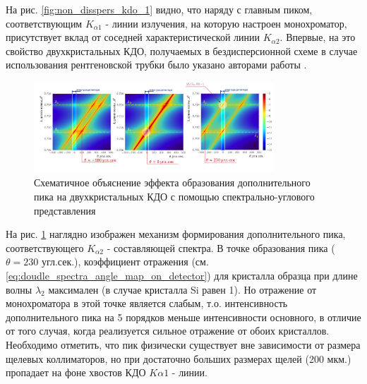 На рис. \ref{fig:non_disspers_kdo_1} видно, что наряду с главным пиком, соответствующим $K_{\alpha1}$ - линии
излучения, на которую настроен монохроматор, присутствует вклад от соседней характеристической линии
 $K_{\alpha2}$. Впервые, на это свойство двухкристальных КДО, получаемых в бездисперсионной
схеме в случае использования рентгеновской трубки было указано авторами работы \cite{chuev2008}.

\begin{figure}[H]
  \centering
  \includegraphics[width=0.8\textwidth]{images/vklad_kalpha2.png}
  \caption{Схематичное объяснение эффекта образования дополнительного пика на двухкристальных КДО
  с помощью спектрально-углового представления}
  \label{ris:vklad_kalpha2}
\end{figure}

На рис. \ref{ris:vklad_kalpha2} наглядно изображен механизм формирования дополнительного пика,
соответствующего $K_{\alpha 2}$ - составляющей спектра. В точке образования пика ($\theta = 230$ угл.сек.), коэффициент
отражения  (см. \ref{eq:doudle_spectra_angle_map_on_detector})
для кристалла образца при длине волны $\lambda_2$ максимален (в случае кристалла Si равен 1). Но отражение
от монохроматора в этой точке является слабым, т.о. интенсивность дополнительного пика на 5 порядков меньше
интенсивности основного, в отличие от того случая, когда реализуется сильное отражение от обоих кристаллов.
 Необходимо отметить, что пик физически существует вне зависимости от размера щелевых коллиматоров, но
при достаточно больших размерах щелей (200 мкм.) пропадает на фоне хвостов КДО $K{\alpha 1}$ - линии.
